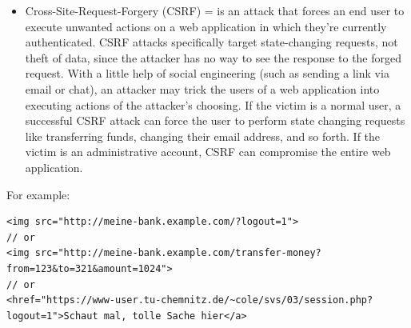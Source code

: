 \documentclass[11pt]{article}
\begin{document}
\begin{itemize}
\item Cross-Site-Request-Forgery (CSRF) = is an attack that forces an end user to execute unwanted actions on a web application in which they're currently authenticated. CSRF attacks specifically target state-changing requests, not theft of data, since the attacker has no way to see the response to the forged request. With a little help of social engineering (such as sending a link via email or chat), an attacker may trick the users of a web application into executing actions of the attacker's choosing. If the victim is a normal user, a successful CSRF attack can force the user to perform state changing requests like transferring funds, changing their email address, and so forth. If the victim is an administrative account, CSRF can compromise the entire web application.\\
\end{itemize}
For example:
\lstset{breaklines=true,language=javascript,label= ,caption= ,captionpos=b,numbers=none}
\begin{lstlisting}
<img src="http://meine-bank.example.com/?logout=1">
// or
<img src="http://meine-bank.example.com/transfer-money?from=123&to=321&amount=1024">
// or
<href="https://www-user.tu-chemnitz.de/~cole/svs/03/session.php?logout=1">Schaut mal, tolle Sache hier</a>
\end{lstlisting}
\end{document}
